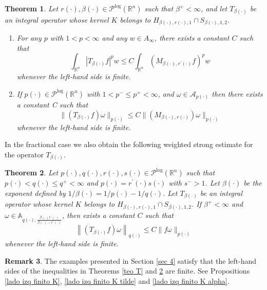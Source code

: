 \documentclass[a4paper,11pt,reqno]{amsart}
\theoremstyle{plain}
\numberwithin{equation}{section}
\newtheorem{teo}{Theorem}[section]
\theoremstyle{definition}
\newtheorem{remark}[teo]{Remark}
\newcommand{\R}{{\mathbb{R}^n}}
\begin{document}
\begin{teo}\label{teo Hör frac}
	Let $r(\cdot),\beta(\cdot)\in\mathcal{P}^{\log}(\R)$ such that $\beta^+<\infty$, and let $T_{\beta(\cdot)}$ be an integral operator whose kernel $K$ belongs to $H_{\beta(\cdot),r(\cdot),1}\cap S_{\beta(\cdot),1,2}$.
	\begin{enumerate}[label=\alph*)]
		\item For any $p$ with $1<p<\infty$ and any $w\in A_\infty$, there exists a constant $C$ such that
		\begin{equation*}
			\int_{\R}|T_{\beta(\cdot)}f|^p w\leq 	C\int_{\R}\left(M_{\beta(\cdot),r^\prime(\cdot)}f\right)^p w
		\end{equation*}
	whenever the left-hand side is finite.
		\item 
		
		If $p(\cdot)\in\mathcal{P}^{\text{log}}(\R)$ with $1<p^-\leq p^+<\infty$, and $\omega\in \mathcal{A}_{p(\cdot)}$ then there exists a constant C such that
	\begin{equation*}
		\|\left(T_{\beta(\cdot)}f\right)\omega\|_{p(\cdot)}\leq C \|(M_{\beta(\cdot),r(\cdot)})\omega\|_{p(\cdot)}
	\end{equation*}
	whenever the left-hand side is finite.	
	\end{enumerate}
\end{teo}
In the fractional case we also obtain the following weighted strong estimate for the operator $T_{\beta(\cdot)}$.
\begin{teo}\label{teo TB}
	Let $p(\cdot),q(\cdot),r(\cdot),s(\cdot)\in\mathcal{P}^{\log}(\R)$ such that $p(\cdot)<q(\cdot)\leq q^+<\infty$ and $p(\cdot)=r^\prime(\cdot)s(\cdot)$ with $s^->1$. Let $\beta(\cdot)$ be the exponent defined by $1/\beta(\cdot)=1/p(\cdot)-1/q(\cdot)$. Let $T_{\beta(\cdot)}$ be an integral operator whose kernel $K$ belongs to $H_{\beta(\cdot),r(\cdot),1}\cap S_{\beta(\cdot),1,2}$. If $\beta^+<\infty$ and $\omega\in \mathbb{A}_{q(\cdot),\frac{\beta(\cdot) r^\prime(\cdot)}{\beta(\cdot)-r^\prime(\cdot)}}$, then exists a constant $C$ such that
	$$\left\|\left(T_{\beta(\cdot)}f\right)\omega\right\|_{q(\cdot)}\leq C\|f\omega\|_{p(\cdot)}$$
	whenever the left-hand side is finite.	
\end{teo}
\begin{remark}
	The examples presented in Section \ref{sec 4} satisfy that the left-hand sides of the inequalities in Theorems \ref{teo T} and \ref{teo TB} are finite. See Propositions \ref{lado izq finito K}, \ref{lado izq finito K tilde} and \ref{lado izq finito K alpha}. 	
\end{remark}
\end{document}
